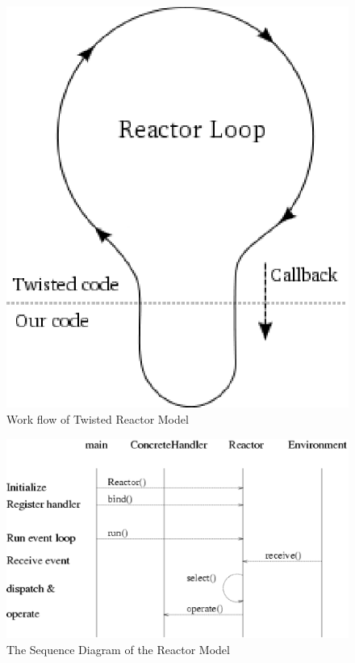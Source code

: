 \begin{figure}[htb!]
    \centering%
    \includegraphics[scale=0.70]{figures/mainloop.eps}
    \caption{Work flow of Twisted Reactor Model}
    \label{fig:mainloop}
\end{figure}
\begin{figure}[htb!]
    \includegraphics[scale=0.50]{figures/eventloop_flow.eps}
    \caption{The Sequence Diagram of the Reactor Model}
    \label{fig:eventloop_flow}
\end{figure}


